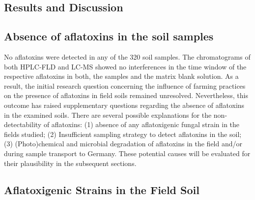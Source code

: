 \begin{refsection}
\section{Results and Discussion}

\subsection{Absence of aflatoxins in the soil samples}
No aflatoxins were detected in any of the 320 soil samples. The chromatograms of both HPLC-FLD and LC-MS showed no interferences in the time window of the respective aflatoxins in both, the samples and the matrix blank solution.
As a result, the initial research question concerning the influence of farming practices on the presence of aflatoxins in field soils remained unresolved. Nevertheless, this outcome has raised supplementary questions regarding the absence of aflatoxins in the examined soils.  There are several possible explanations for the non-detectability of aflatoxins: (1) absence of any aflatoxigenic fungal strain in the fields studied; (2) Insufficient sampling strategy to detect aflatoxins in the soil; (3) (Photo)chemical and microbial degradation of aflatoxins in the field and/or during sample transport to Germany. These potential causes will be evaluated for their plausibility in the subsequent sections.

\subsection{Aflatoxigenic Strains in the Field Soil}


\end{refsection}
